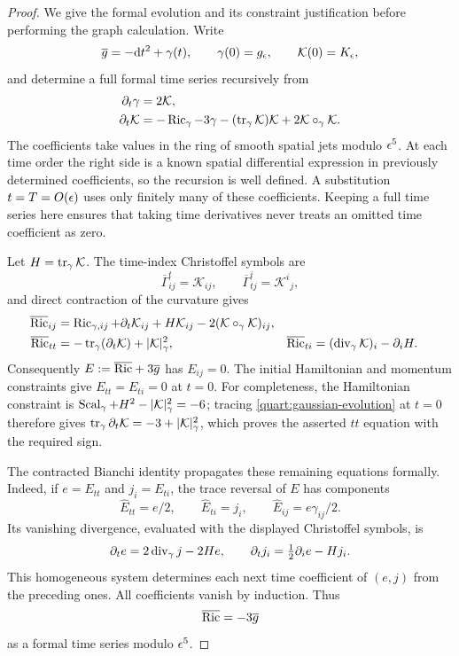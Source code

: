 \begin{proof}
We give the formal evolution and its constraint justification before
performing the graph calculation.  Write
\[
 \overline g=-\mathrm{d} t^2+\gamma(t),\qquad
 \gamma(0)=g_\epsilon,\qquad \mathcal K(0)=K_\epsilon,
\]
and determine a full formal time series recursively from
\begin{align}
 \partial_t\gamma&=2\mathcal K,\nonumber\\
 \partial_t\mathcal K
   &=-\operatorname{Ric}_\gamma-3\gamma
     -(\operatorname{tr}_\gamma\mathcal K)\mathcal K
     +2\mathcal K\circ_\gamma\mathcal K.
 \label{quart:gaussian-evolution}
\end{align}
The coefficients take values in the ring of smooth spatial jets modulo
\(\epsilon^5\).  At each time order the right side is a known spatial
differential expression in previously determined coefficients, so the
recursion is well defined.  A substitution \(t=T=O(\epsilon)\) uses only
finitely many of these coefficients.  Keeping a full time series here
ensures that taking time derivatives never treats an omitted time
coefficient as zero.

Let \(H=\operatorname{tr}_\gamma\mathcal K\).  The time-index Christoffel symbols
are
\[
 \overline\Gamma^t_{ij}=\mathcal K_{ij},\qquad
 \overline\Gamma^i_{tj}=\mathcal K^i{}_j,
\]
and direct contraction of the curvature gives
\begin{align}
 \overline{\operatorname{Ric}}_{ij}
  &=\operatorname{Ric}_{\gamma,ij}+\partial_t\mathcal K_{ij}
       +H\mathcal K_{ij}
       -2(\mathcal K\circ_\gamma\mathcal K)_{ij},\nonumber\\
 \overline{\operatorname{Ric}}_{tt}
  &=-\operatorname{tr}_\gamma(\partial_t\mathcal K)+|\mathcal K|_\gamma^2,
 &\overline{\operatorname{Ric}}_{ti}
  &=(\operatorname{div}_\gamma\mathcal K)_i-\partial_iH.
 \label{quart:gaussian-ricci}
\end{align}
Consequently \(E:=\overline{\operatorname{Ric}}+3\overline g\) has \(E_{ij}=0\).
The initial Hamiltonian and momentum constraints give
\(E_{tt}=E_{ti}=0\) at \(t=0\).  For completeness, the Hamiltonian
constraint is
\(\operatorname{Scal}_\gamma+H^2-|\mathcal K|_\gamma^2=-6\); tracing
\eqref{quart:gaussian-evolution} at \(t=0\) therefore gives
\(\operatorname{tr}_\gamma\partial_t\mathcal K=-3+|\mathcal K|_\gamma^2\),
which proves the asserted \(tt\) equation with the required sign.

The contracted Bianchi identity propagates these remaining equations
formally.  Indeed, if \(e=E_{tt}\) and \(j_i=E_{ti}\), the trace
reversal of \(E\) has components
\[
 \widehat E_{tt}=e/2,\qquad
 \widehat E_{ti}=j_i,\qquad
 \widehat E_{ij}=e\gamma_{ij}/2.
\]
Its vanishing divergence, evaluated with the displayed Christoffel
symbols, is
\begin{equation}
 \partial_t e=2\operatorname{div}_\gamma j-2He,
 \qquad
 \partial_tj_i=\tfrac12\partial_i e-Hj_i.
 \label{quart:bianchi-system}
\end{equation}
This homogeneous system determines each next time coefficient of
\((e,j)\) from the preceding ones.  All coefficients vanish by
induction.  Thus
\begin{equation}
 \overline{\operatorname{Ric}}=-3\overline g
 \label{quart:formal-einstein}
\end{equation}
as a formal time series modulo \(\epsilon^5\).


\end{proof}
